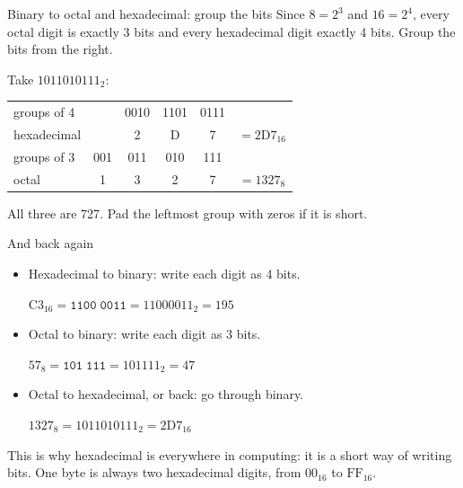 \documentclass[10pt]{wosm-slides}
\newcommand*\base[2]{\ensuremath{\mathrm{#1}_{#2}}}
\begin{document}
\begin{frame}{Binary to octal and hexadecimal: group the bits}
  Since $8 = 2^3$ and $16 = 2^4$, every octal digit is exactly 3 bits and every
  hexadecimal digit exactly 4 bits. Group the bits from the \alert{right}.

  \medskip
  Take \base{1011010111}{2}:
  \begin{center}
    \begin{tabular}{@{}lccccc@{}}
      \toprule
      groups of 4 & & 0010 & 1101 & 0111 & \\
      hexadecimal & & 2 & D & 7 & $= \base{2D7}{16}$ \\
      \midrule
      groups of 3 & 001 & 011 & 010 & 111 & \\
      octal & 1 & 3 & 2 & 7 & $= \base{1327}{8}$ \\
      \bottomrule
    \end{tabular}
  \end{center}

  \medskip
  All three are 727. Pad the leftmost group with zeros if it is short.
\end{frame}

\begin{frame}{And back again}
  \begin{itemize}
    \item Hexadecimal to binary: write each digit as 4 bits.\par
      $\base{C3}{16} = \texttt{1100}\;\texttt{0011} = \base{11000011}{2} = 195$
    \item Octal to binary: write each digit as 3 bits.\par
      $\base{57}{8} = \texttt{101}\;\texttt{111} = \base{101111}{2} = 47$
    \item Octal to hexadecimal, or back: go through binary.\par
      $\base{1327}{8} = \base{1011010111}{2} = \base{2D7}{16}$
  \end{itemize}

  \bigskip
  \begin{remark}
    This is why hexadecimal is everywhere in computing: it is a short way of writing
    bits. One byte is always two hexadecimal digits, from \base{00}{16} to
    \base{FF}{16}.
  \end{remark}
\end{frame}
\end{document}
